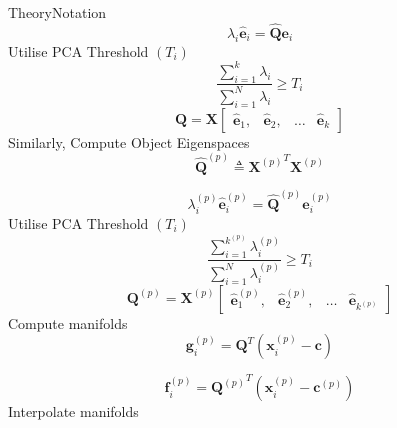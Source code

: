 \documentclass[aspectratio=169, handout, 10pt, hyperref=colorlinks]{beamer}
\begin{document}
\begin{frame}[allowframebreaks]{Theory}{Notation}
    \begin{equation}
        \lambda_i \mathbf{\hat{e}}_i = \mathbf{\hat{Q}}\mathbf{e}_i
    \end{equation}
Utilise PCA Threshold $(T_i)$
    \begin{equation}
        \dfrac{\sum_{i = 1}^{k} \lambda_i}{\sum_{i = 1}^{N} \lambda_i} \geq T_i
    \end{equation}
    \begin{equation}
        \mathbf{Q} = \mathbf{X}\begin{bmatrix}
            \mathbf{\hat{e}}_1, & \mathbf{\hat{e}}_2, & \dots & \mathbf{\hat{e}}_{k}
        \end{bmatrix}
    \end{equation}
Similarly, Compute Object Eigenspaces
\begin{equation}
       \mathbf{\hat{Q}}^{(p)} \triangleq {\mathbf{X}^{(p)}}^T\mathbf{X}^{(p)}
    \end{equation}

    \begin{equation}
        \lambda_i^{(p)} \mathbf{\hat{e}}_i^{(p)} = \mathbf{\hat{Q}}^{(p)}\mathbf{\hat{e}}_i^{(p)}
    \end{equation}
Utilise PCA Threshold $(T_i)$
    \begin{equation}
        \dfrac{\sum_{i = 1}^{{k}^{(p)}} \lambda_i^{(p)}}{\sum_{i = 1}^{N} \lambda_i^{(p)}} \geq T_i
    \end{equation}
    \begin{equation}
        \mathbf{Q}^{(p)} = \mathbf{X}^{(p)}\begin{bmatrix}
            \mathbf{\hat{e}}_1^{(p)}, & \mathbf{\hat{e}}_2^{(p)}, & \dots & \mathbf{\hat{e}}_{k^{(p)}}
        \end{bmatrix}
    \end{equation}
Compute manifolds
    \begin{equation}
        \mathbf{g}_{i}^{(p)} =
        \mathbf{Q}^T
        (\mathbf{x}_{i}^{(p)} - \mathbf{c})
    \end{equation}

    \begin{equation}
        \mathbf{f}_{i}^{(p)} = 
        {\mathbf{Q}^{(p)}}^T(\mathbf{x}^{(p)}_{i} - \mathbf{c}^{(p)})
    \end{equation}
Interpolate manifolds


\end{frame}
\end{document}
